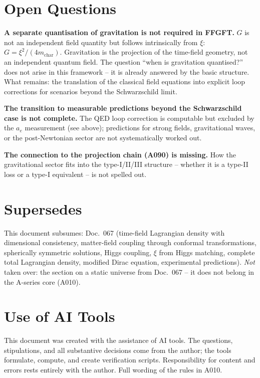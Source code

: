 \section{Open Questions}

\textbf{A separate quantisation of gravitation is not required in FFGFT.}
$G$ is not an independent field quantity but follows intrinsically from $\xi$:
$G=\xi^2/(4m_\text{char})$. Gravitation is the projection of the time-field
geometry, not an independent quantum field. The question ``when is gravitation
quantised?'' does not arise in this framework -- it is already answered by the
basic structure. What remains: the translation of the classical field equations
into explicit loop corrections for scenarios beyond the Schwarzschild limit.

\textbf{The transition to measurable predictions beyond the Schwarzschild case is
not complete.} The QED loop correction is computable but excluded by the $a_e$ measurement (see above); predictions for strong
fields, gravitational waves, or the post-Newtonian sector are not systematically
worked out.

\textbf{The connection to the projection chain (A090) is missing.} How the
gravitational sector fits into the type-I/II/III structure -- whether it is a
type-II loss or a type-I equivalent -- is not spelled out.

\section{Supersedes}

This document subsumes: Doc.~067 (time-field Lagrangian density with dimensional
consistency, matter-field coupling through conformal transformations, spherically
symmetric solutions, Higgs coupling, $\xi$ from Higgs matching, complete total
Lagrangian density, modified Dirac equation, experimental predictions). \emph{Not}
taken over: the section on a static universe from Doc.~067 -- it does not belong
in the A-series core (A010).

\section{Use of AI Tools}

This document was created with the assistance of AI tools. The questions,
stipulations, and all substantive decisions come from the author; the tools
formulate, compute, and create verification scripts.
Responsibility for content and errors rests entirely with the author.
Full wording of the rules in A010.
